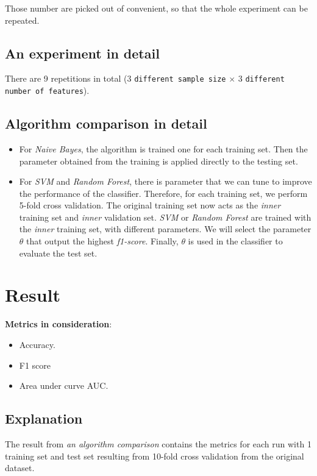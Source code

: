 \documentclass[conference]{IEEEtran}
\begin{document}
Those number are picked out of convenient, so that the whole experiment can be repeated.

\subsection{An experiment in detail}
There are 9 repetitions in total (3 \texttt{different sample size} $\times$ 3 \texttt{different number of features}).

\subsection{Algorithm comparison in detail}
\begin{itemize}
\item For \textit{Naive Bayes}, the algorithm is trained one for each training set. Then the parameter obtained from the training is applied directly to the testing set.
\item For \textit{SVM} and \textit{Random Forest}, there is parameter that we can tune to improve the performance of the classifier. Therefore, for each training set, we perform 5-fold cross validation. The original training set now acts as the \textit{inner} training set and \textit{inner} validation set. \textit{SVM} or \textit{Random Forest} are trained with the \textit{inner} training set, with different parameters. We will select the parameter $\theta$ that output the highest \textit{f1-score}. Finally, $\theta$ is used in the classifier to evaluate the test set.
\end{itemize}

\section{Result}
\textbf{Metrics in consideration}:
\begin{itemize}
\item Accuracy.
\item F1 score
\item Area under curve AUC.
\end{itemize}

\subsection{Explanation}
The result from \textit{an algorithm comparison} contains the metrics for each run with 1 training set and test set resulting from 10-fold cross validation from the original dataset.
\end{document}
